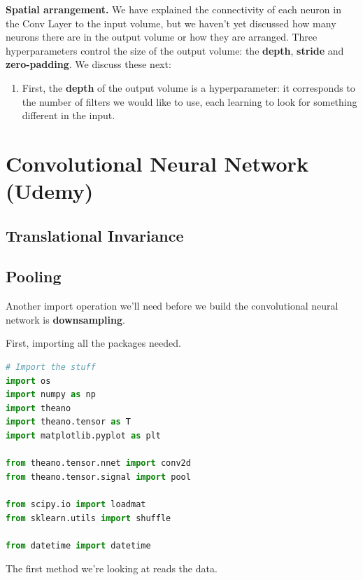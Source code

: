 \documentclass[fleqn,10pt]{olplainarticle}
\theoremstyle{definition}
\theoremstyle{remark}
\begin{document}
\textbf{Spatial arrangement.} We have explained the connectivity of each neuron in the Conv Layer to the input volume, but we haven't yet discussed how many neurons there are in the output volume or how they are arranged. Three hyperparameters control the size of the output volume: the \textbf{depth}, \textbf{stride} and \textbf{zero-padding}. We discuss these next:

\begin{enumerate}
\item First, the \textbf{depth} of the output volume is a hyperparameter: it corresponds to the number of filters we would like to use, each learning to look for something different in the input. 
\end{enumerate}

\section*{Convolutional Neural Network (Udemy)}
\subsection*{Translational Invariance}

\subsection*{Pooling}
Another import operation we'll need before we build the convolutional neural network is \textbf{downsampling}.

First, importing all the packages needed.

\begin{lstlisting}[language=Python, caption=Importing]
# Import the stuff
import os
import numpy as np
import theano
import theano.tensor as T
import matplotlib.pyplot as plt

from theano.tensor.nnet import conv2d
from theano.tensor.signal import pool

from scipy.io import loadmat
from sklearn.utils import shuffle

from datetime import datetime
\end{lstlisting}

The first method we're looking at reads the data. 
\end{document}
